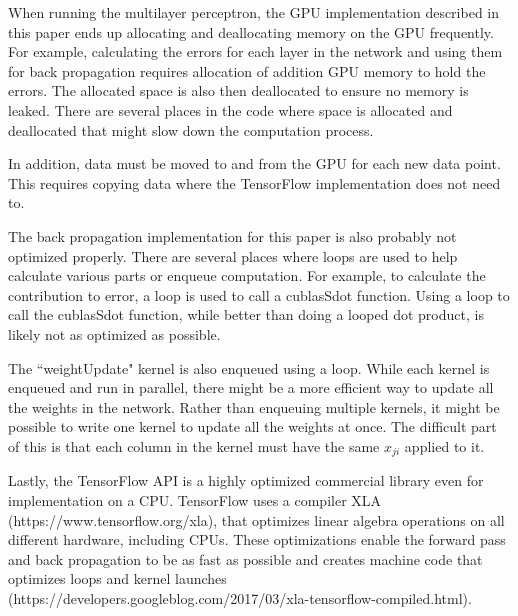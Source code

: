 \documentclass[jair, twoside,11pt,theapa]{article}
\begin{document}
When running the multilayer perceptron, the GPU implementation described in this paper ends up allocating and deallocating memory on the GPU frequently. 
For example, calculating the errors for each layer in the network and using them for back propagation requires allocation of addition GPU memory to hold the errors. 
The allocated space is also then deallocated to ensure no memory is leaked. 
There are several places in the code where space is allocated and deallocated that might slow down the computation process. 

In addition, data must be moved to and from the GPU for each new data point. 
This requires copying data where the TensorFlow implementation does not need to. 

The back propagation implementation for this paper is also probably not optimized properly. 
There are several places where loops are used to help calculate various parts or enqueue computation. 
For example, to calculate the contribution to error, a loop is used to call a cublasSdot function. 
Using a loop to call the cublasSdot function, while better than doing a looped dot product, is likely not as optimized as possible. 

The ``weightUpdate" kernel is also enqueued using a loop.
While each kernel is enqueued and run in parallel, there might be a more efficient way to update all the weights in the network. 
Rather than enqueuing multiple kernels, it might be possible to write one kernel to update all the weights at once. 
The difficult part of this is that each column in the kernel must have the same $x_{ji}$ applied to it. 

Lastly, the TensorFlow API is a highly optimized commercial library even for implementation on a CPU.
TensorFlow uses a compiler XLA (https://www.tensorflow.org/xla), that optimizes linear algebra operations on all different hardware, including CPUs. 
These optimizations enable the forward pass and back propagation to be as fast as possible and creates machine code that optimizes loops and kernel launches (https://developers.googleblog.com/2017/03/xla-tensorflow-compiled.html). 




\end{document}
